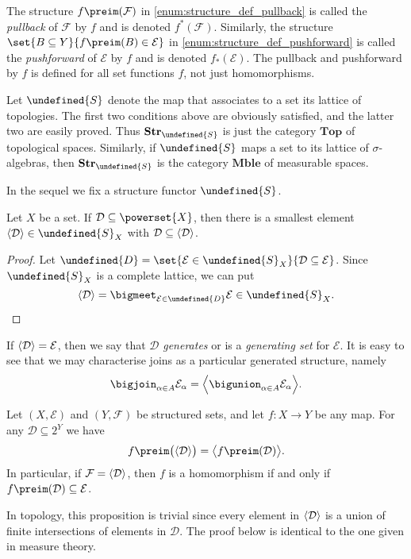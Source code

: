 \documentclass[article, a4paper, 11pt, oneside]{memoir}
\let\mathfrak\undefined
\numberwithin{equation}{chapter}
\newcommand{\calE}{\mathcal{E}}
\newcommand{\calD}{\mathcal{D}}
\newcommand{\calF}{\mathcal{F}}
\newcommand{\strucS}{\mathfrak{S}}
\DeclarePairedDelimiter{\gen}{\langle}{\rangle} %
\newcommand{\ncat}[1]{\mathbf{#1}} %
\newcommand{\catTop}{\ncat{Top}} %
\newcommand{\catMble}{\ncat{Mble}} %
\newcommand{\catStruc}[1]{\ncat{Str}_{#1}} %
\newcommand{\catStrucS}{\catStruc{\strucS}} %
\begin{document}
The structure $f\preim(\calF)$ in \cref{enum:structure_def_pullback} is called the \emph{pullback} of $\calF$ by $f$ and is denoted $f^*(\calF)$. Similarly, the structure $\set{B \subseteq Y}{f\preim(B) \in \calE}$ in \cref{enum:structure_def_pushforward} is called the \emph{pushforward} of $\calE$ by $f$ and is denoted $f_*(\calE)$. The pullback and pushforward by $f$ is defined for all set functions $f$, not just homomorphisms.

\begin{example}
    Let $\strucS$ denote the map that associates to a set its lattice of topologies. The first two conditions above are obviously satisfied, and the latter two are easily proved. Thus $\catStrucS$ is just the category $\catTop$ of topological spaces. Similarly, if $\strucS$ maps a set to its lattice of $\sigma$-algebras, then $\catStrucS$ is the category $\catMble$ of measurable spaces.
\end{example}

In the sequel we fix a structure functor $\strucS$.

\begin{lemma}
    Let $X$ be a set. If $\calD \subseteq \powerset{X}$, then there is a smallest element $\gen{\calD} \in \strucS_X$ with $\calD \subseteq \gen{\calD}$.
\end{lemma}

\begin{proof}
    Let $\mathfrak{D} = \set{\calE \in \strucS_X}{\calD \subseteq \calE}$. Since $\strucS_X$ is a complete lattice, we can put
    \begin{equation*}
        \gen{\calD} = \bigmeet_{\calE \in \mathfrak{D}} \calE \in \strucS_X.
    \end{equation*}
\end{proof}
%
If $\gen{\calD} = \calE$, then we say that $\calD$ \emph{generates} or is a \emph{generating set} for $\calE$. It is easy to see that we may characterise joins as a particular generated structure, namely
%
\begin{equation}
    \label{eq:join_as_generated_structure}
    \bigjoin_{\alpha \in A} \calE_\alpha
        = \gen[\Big]{ \bigunion_{\alpha \in A} \calE_\alpha }.
\end{equation}

\begin{proposition}
    \label{thm:preimage_and_generation_commute}
    Let $(X,\calE)$ and $(Y,\calF)$ be structured sets, and let $f \colon X \to Y$ be any map. For any $\calD \subseteq 2^Y$ we have
    \begin{equation*}
        f\preim\bigl( \gen{\calD} \bigr) = \gen[\big]{f\preim(\calD)}.
    \end{equation*}
    In particular, if $\calF = \gen{\calD}$, then $f$ is a homomorphism if and only if $f\preim(\calD) \subseteq \calE$.
\end{proposition}
%
In topology, this proposition is trivial since every element in $\gen{\calD}$ is a union of finite intersections of elements in $\calD$. The proof below is identical to the one given in measure theory.
\end{document}
